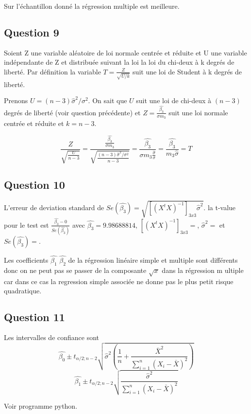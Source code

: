\documentclass[]{book}
\theoremstyle{definition}
\begin{document}
Sur l'\'echantillon donn\'e la r\'egression multiple est meilleure. 

\subsection*{Question 9}
Soient Z une variable al\'eatoire de loi normale centr\'ee et r\'eduite et U une variable ind\'ependante de Z et distribu\'ee suivant la loi la loi du chi-deux \`a k degr\'es de libert\'e. Par d\'efinition la variable $T=\frac {Z}{\sqrt {U/k}}$ suit une loi de Student \`a k degr\'es de libert\'e.

Prenons $U = (n-3)\hat{\sigma}^2/\sigma^2$. On sait que $U$ suit une loi de chi-deux \`a $(n-3)$ degr\'es de libert\'e (voir question pr\'ec\'edente) et $Z = \frac{\hat{\beta_3}}{\sigma m_3}$ suit une loi normale centr\'ee et r\'eduite et $k = n-3$.

$$
\frac{Z}{\sqrt{\frac{U}{n-3}}} = \frac{\frac{\hat{\beta_3}}{\sigma m_3}}{\sqrt{\frac{(n-3)\hat{\sigma}^2/\sigma^2}{n-3}}}
= \frac{\hat{\beta_3}}{\sigma m_3 \frac{\hat{\sigma}}{\sigma}} 
= \frac{\hat{\beta_3}}{m_3 \hat{\sigma}} = T
$$


\subsection*{Question 10}
L'erreur de deviation standard de $Se(\hat{\beta_3}) = \sqrt{[(X^tX)^{-1}]_{3x3}\hat{\sigma}^2}$. la t-value pour le test est $\frac{\hat{\beta_3} - 0}{Se(\hat{\beta_3})}$ avec $\hat{\beta_3} = 9.98688814$, $[(X^tX)^{-1}]_{3x3} = $, $\hat{\sigma}^2 = $ et $Se(\hat{\beta_3}) = $.

Les coefficients $\hat{\beta_1}$ $\hat{\beta_2}$ de la r\'egression lin\'eaire simple et multiple sont diff\'erents donc on ne peut pas se passer de la composante $\sqrt{x}$ dans la r\'egression m ultiple car dans ce cas la regression simple associ\'ee ne donne pas le plus petit risque quadratique.  

\subsection*{Question 11}
Les intervalles de confiance sont 
$$
\hat{\beta_0} \pm t_{\alpha/2;n-2}\sqrt{\hat{\sigma}^2\left(\frac{1}{n}+\frac{\bar{X}^2}{\sum_{i=1}^{n}{(X_i-\bar{X})^2}}\right)}
$$
$$
\hat{\beta_1} \pm t_{\alpha/2;n-2}\sqrt{\frac{\hat{\sigma}^2}{\sum_{i=1}^{n}{(X_i-\bar{X})^2}}}
$$

Voir programme python.
\end{document}
